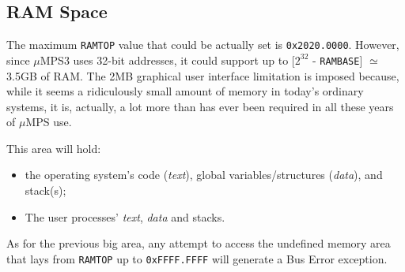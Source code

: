 \documentclass[12pt,a4paper,openright,twoside]{report}
\begin{document}
\subsection{RAM Space}
	The maximum \texttt{RAMTOP} value that could be actually set is \texttt{0x2020.0000}.
	However, since $\mu$MPS3 uses 32-bit addresses, it could support up to [$2^{32}$ - \texttt{RAMBASE}] $\simeq$ 3.5GB of RAM.
	The 2MB graphical user interface limitation is imposed because, while it seems a ridiculously small amount of memory in today's ordinary systems, it is, actually, a lot more than has ever been required in all these years of $\mu$MPS use.
	
	This area will hold:
	\begin{itemize}  
	\item the operating system's code (\textit{text}), global variables/structures (\textit{data}), and stack(s);
	\item The user processes' \textit{text}, \textit{data} and stacks.
	\end{itemize}
	As for the previous big area, any attempt to access the undefined memory area that lays from \texttt{RAMTOP} up to \texttt{0xFFFF.FFFF} will generate a Bus Error exception.
 
\end{document}
